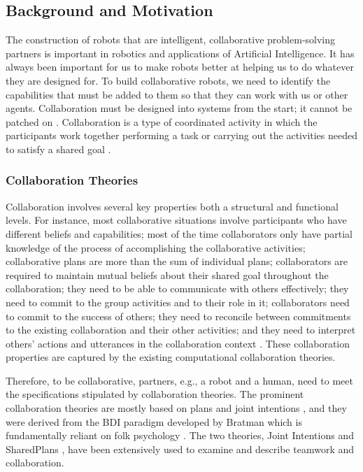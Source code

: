 \documentclass[a4paper, 11pt]{article}
\begin{document}
\begin{small}
\vspace*{-4mm}
\section*{Background and Motivation}
\vspace*{-2mm}
The construction of robots that are intelligent, collaborative problem-solving
partners is important in robotics and applications of Artificial Intelligence.
It has always been important for us to make robots better at helping us to do
whatever they are designed for. To build collaborative robots, we need to
identify the capabilities that must be added to them so that they can work with
us or other agents. Collaboration must be designed into systems from the start;
it cannot be patched on \cite{grosz:collaborative-systems}. Collaboration is a
type of coordinated activity in which the participants work together performing
a task or carrying out the activities needed to satisfy a shared goal
\cite{grosz:collaboration}.
\vspace*{-4mm}
\subsubsection*{Collaboration Theories}
Collaboration involves several key properties both a structural and functional
levels. For instance, most collaborative situations involve participants who
have different beliefs and capabilities; most of the time collaborators only
have partial knowledge of the process of accomplishing the collaborative
activities; collaborative plans are more than the sum of individual plans;
collaborators are required to maintain mutual beliefs about their shared goal
throughout the collaboration; they need to be able to communicate with others
effectively; they need to commit to the group activities and to their role in
it; collaborators need to commit to the success of others; they need to
reconcile between commitments to the existing collaboration and their other
activities; and they need to interpret others' actions and utterances in the
collaboration context \cite{grosz:mice-menus}. These collaboration properties
are captured by the existing computational collaboration theories.

Therefore, to be collaborative, partners, e.g., a robot and a human, need
to meet the specifications stipulated by collaboration theories. The prominent
collaboration theories are mostly based on plans and joint intentions
\cite{cohen:teamwork,grosz:plans-discourse,Litman:discourse-commonsense}, and
they were derived from the BDI paradigm developed by Bratman
\cite{bratman:intentions-plans} which is fundamentally reliant on folk
psychology \cite{ravenscroft:folk}. The two theories, Joint Intentions
\cite{cohen:teamwork} and SharedPlans \cite{grosz:plans-discourse}, have been
extensively used to examine and describe teamwork and collaboration. 


\end{small}
\end{document}
